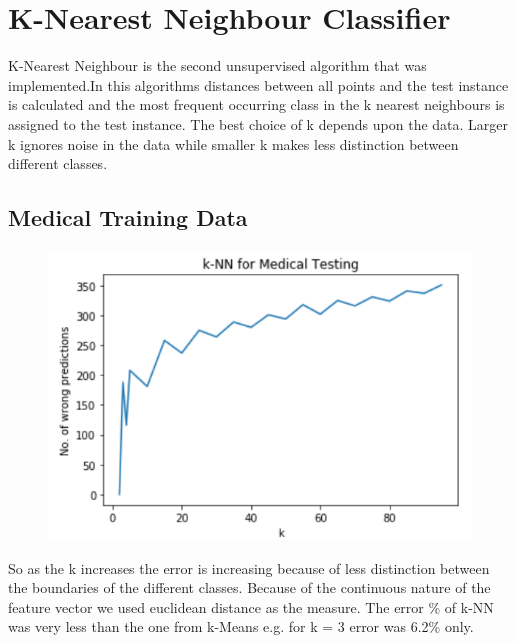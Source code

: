 \documentclass[conference]{IEEEtran}
\begin{document}
\section{\textbf{K-Nearest Neighbour Classifier}}
K-Nearest Neighbour is the second unsupervised algorithm that was implemented.In this algorithms distances between all points and the test instance is calculated and the most frequent occurring class in the k nearest neighbours is assigned to the test instance. The best choice of k depends upon the data. Larger k ignores noise in the data while smaller k makes less distinction between different classes.
\subsection{Medical Training Data}
\begin{figure}[htbp]
\centerline{\includegraphics{knnmedical.PNG}}
\label{fig}
\end{figure}
So as the k increases the error is increasing because of less distinction between the boundaries of the different classes. Because of the continuous nature of the feature vector we used euclidean distance as the measure. The error \% of k-NN was very less than the one from k-Means e.g. for k = 3 error was 6.2\% only. 
\end{document}

